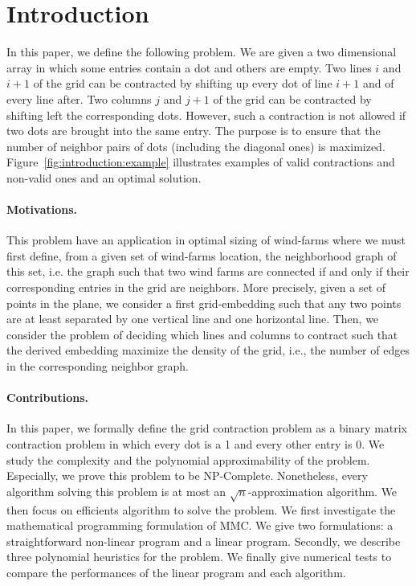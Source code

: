 \section{Introduction}
\label{sect:intro}


In this paper, we define the following problem. We are given a two dimensional array in which some entries contain a dot and others are empty. Two lines $i$ and $i+1$ of the grid can be contracted by shifting up every dot of line $i+1$ and of every line after. Two columns $j$ and $j+1$ of the grid can be contracted by shifting left the corresponding dots. However, such a contraction is not allowed if two dots are brought into the same entry. The purpose is to ensure that the number of neighbor pairs of dots (including the diagonal ones) is maximized. Figure~\ref{fig:introduction:example} illustrates examples of valid contractions and non-valid ones and an optimal solution.




\paragraph{Motivations. }
This problem have an application in optimal sizing of wind-farms \cite{Pillai2015} where we must first define, from a given set of wind-farms location, the neighborhood graph of this set, i.e. the graph such that two wind farms are connected if and only if their corresponding entries in the grid are neighbors. More precisely, given a set of points in the plane, we consider a first grid-embedding such that any two points are at least separated by one vertical line and one horizontal line. Then, we consider the problem of deciding which lines and columns to contract such that the derived embedding maximize the density of the grid, i.e., the number of edges in the corresponding neighbor graph.
\vspace{-0.2cm}
\paragraph{Contributions. } In this paper, we formally define the grid contraction problem as a binary matrix contraction problem in which every dot is a 1 and every other entry is 0. We study the complexity and the polynomial approximability of the problem. Especially, we prove this problem to be NP-Complete. Nonetheless, every algorithm solving this problem is at most an $\sqrt{n}$-approximation algorithm. We then focus on efficients algorithm to solve the problem. We first investigate the mathematical programming formulation of MMC. We give two formulations: a straightforward non-linear program and a linear program.
Secondly, we describe three polynomial heuristics for the problem. We finally give numerical tests to compare the performances of the linear program and each algorithm. 

